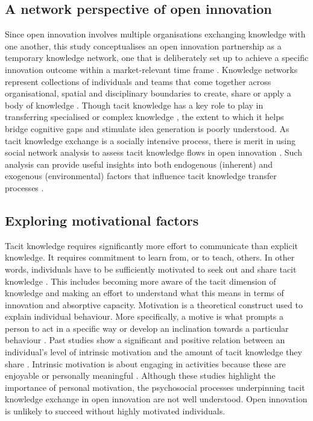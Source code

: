 \subsection{A network perspective of open innovation}

Since open innovation involves multiple organisations exchanging knowledge with one another, this study conceptualises an open innovation partnership as a temporary knowledge network, one that is deliberately set up to achieve a specific innovation outcome within a market-relevant time frame \citep{perez2013temporary,cococcioni2014exploring,terhorst2018tacit}. Knowledge networks represent collections of individuals and teams that come together across organisational, spatial and disciplinary boundaries to create, share or apply a body of knowledge \citep{pugh2013designing}. Though tacit knowledge has a key role to play in transferring specialised or complex knowledge \citep{davenport1998working,sternberg1999tacit,johnson2002all,endres2007tacit,tell2017managing}, the extent to which it helps bridge cognitive gaps and stimulate idea generation is poorly understood. As tacit knowledge exchange is a socially intensive process, there is merit in using social network analysis to assess tacit knowledge flows in open innovation \citep{leonard1998role,busch2000graphically,zhu2007social}. Such analysis can provide useful insights into both endogenous (inherent) and exogenous (environmental) factors that influence tacit knowledge transfer processes \citep{kolleck2013social,tortoriello2015social}. 

\subsection{Exploring motivational factors}

Tacit knowledge requires significantly more effort to communicate than explicit knowledge. It requires commitment to learn from, or to teach, others. In other words, individuals have to be sufficiently motivated to seek out and share tacit knowledge \citep{leonard1998role}. This includes becoming more aware of the tacit dimension of knowledge and making an effort to understand what this means in terms of innovation and absorptive capacity. Motivation is a theoretical construct used to explain individual behaviour. More specifically, a motive is what prompts a person to act in a specific way or develop an inclination towards a particular behaviour \citep{pardee1990motivation}. Past studies show a significant and positive relation between an individual's level of intrinsic motivation and the amount of tacit knowledge they share \citep[e.g.][]{osterloh2000motivation,kaser2001knowledge,smith2001role}. Intrinsic motivation is about engaging in activities because these are enjoyable or personally meaningful \citep{ryan2000intrinsic}. Although these studies highlight the importance of personal motivation, the psychosocial processes underpinning tacit knowledge exchange in open innovation are not well understood. Open innovation is unlikely to succeed without highly motivated individuals.

